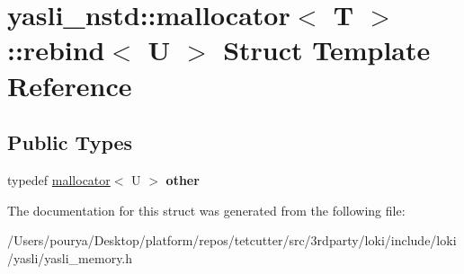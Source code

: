 \hypertarget{structyasli__nstd_1_1mallocator_1_1rebind}{}\section{yasli\+\_\+nstd\+:\+:mallocator$<$ T $>$\+:\+:rebind$<$ U $>$ Struct Template Reference}
\label{structyasli__nstd_1_1mallocator_1_1rebind}
\subsection*{Public Types}
\begin{DoxyCompactItemize}
\item 
\hypertarget{structyasli__nstd_1_1mallocator_1_1rebind_a213cf447c60f4e1b10d4a106ebd1f19c}{}typedef \hyperlink{classyasli__nstd_1_1mallocator}{mallocator}$<$ U $>$ {\bfseries other}\label{structyasli__nstd_1_1mallocator_1_1rebind_a213cf447c60f4e1b10d4a106ebd1f19c}

\end{DoxyCompactItemize}


The documentation for this struct was generated from the following file\+:\begin{DoxyCompactItemize}
\item 
/\+Users/pourya/\+Desktop/platform/repos/tetcutter/src/3rdparty/loki/include/loki/yasli/yasli\+\_\+memory.\+h\end{DoxyCompactItemize}
